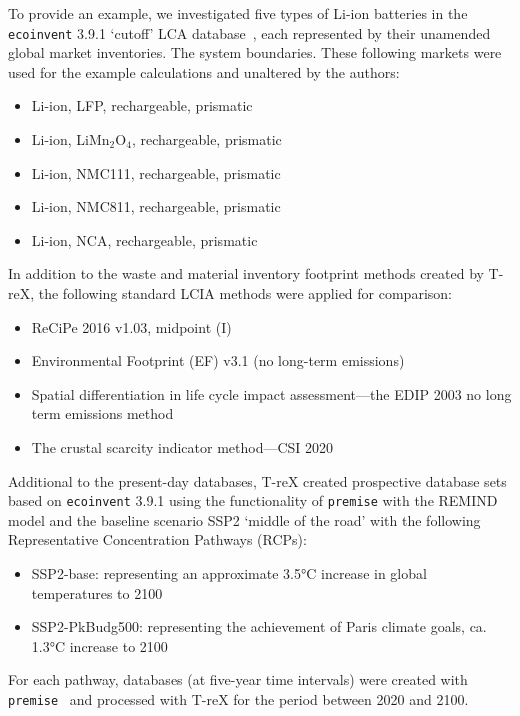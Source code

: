 \documentclass[a4paper,fleqn]{cas-dc}
\renewcommand{\texttt}[1]{{\ttfamily\small\nolinkurl{#1}}}
\begin{document}
To provide an example, we investigated five types of Li-ion batteries in the
\texttt{ecoinvent} 3.9.1 `cutoff' LCA database~\citep{ecoinvent2016version3},
each represented by their unamended global market inventories. The system
boundaries. These following markets were used for the example calculations and
unaltered by the authors:
\begin{itemize}
	\itemsep=0pt
	\item Li-ion, LFP, rechargeable, prismatic
	\item Li-ion, LiMn\(_2\)O\(_4\), rechargeable, prismatic
	\item Li-ion, NMC111, rechargeable, prismatic
	\item Li-ion, NMC811, rechargeable, prismatic
	\item Li-ion, NCA, rechargeable, prismatic
\end{itemize}

In addition to the waste and material inventory footprint methods created by
T-reX, the following standard LCIA methods were applied for comparison:

\begin{itemize}
	\itemsep=0pt
	\item ReCiPe 2016 v1.03, midpoint (I)~\citep{huijbregts2016recipe}
	\item Environmental Footprint (EF) v3.1 (no long-term emissions)~\citep{eu2023ef}
	\item Spatial differentiation in life cycle impact assessment---the EDIP 2003 no long
	      term emissions method~\citep{hauschild2003edip}
	\item The crustal scarcity indicator method---CSI 2020~\citep{arvidsson2020csi}
\end{itemize}

Additional to the present-day databases, T-reX created prospective database
sets based on \texttt{ecoinvent} 3.9.1 using the functionality of
\texttt{premise} with the REMIND model and the baseline scenario SSP2 `middle
of the road' with the following Representative Concentration Pathways (RCPs):
\begin{itemize}
	\item SSP2-base: representing an approximate 3.5°C increase in global temperatures to
	      2100
	\item SSP2-PkBudg500: representing the achievement of Paris climate goals, ca. 1.3°C
	      increase to 2100
\end{itemize}

For each pathway, databases (at five-year time intervals) were created with
\texttt{premise}~\citep{sacchi2022premise} and processed with T-reX for the
period between 2020 and 2100.
\end{document}
